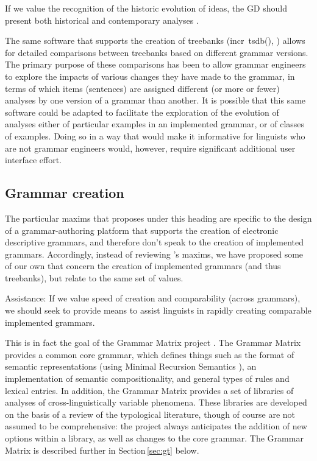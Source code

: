 \documentclass[12pt]{article}
\newcommand{\sref}[1]{Section$\,$\ref{#1}}
\newcommand{\itsdb}{\mbox{\sf \lbrack incr tsdb()\rbrack}}
\begin{document}
\begin{exe}
 If we value the recognition of the historic evolution
of ideas, the GD should present both historical and contemporary
analyses \cite[360]{Noonan:06}.
\end{exe}

The same software that supports the creation of treebanks
({\itsdb}, ) allows for detailed comparisons
between treebanks based on different grammar versions.  The primary
purpose of these comparisons has been to allow grammar engineers
to explore the impacts of various changes they have made to the
grammar, in terms of which items (sentences) are assigned different
(or more or fewer) analyses by one version of a grammar than 
another.  It is possible that this same software could be adapted
to facilitate the exploration of the evolution of analyses either of particular examples
in an implemented grammar, or of classes of examples.  Doing so in a way
that would make it informative for linguists who are not grammar
engineers would, however, require significant additional user interface
effort. 


\subsection{Grammar creation}

The particular maxims that \citeauthor{Nordhoff:08} proposes under
this heading are specific to the design of a grammar-authoring platform
that supports the creation of electronic descriptive grammars, and
therefore don't speak to the creation of implemented grammars. Accordingly,
instead of reviewing \citeauthor{Nordhoff:08}'s maxims, we have
proposed some of our own that concern the creation of implemented
grammars (and thus treebanks), but relate to the same set of values.

\begin{exe}
\ex\label{ex:cc} {\sc Assistance}: If we value speed of creation
and comparability (across grammars), we should seek to provide
means to assist linguists in rapidly creating comparable implemented grammars.
\end{exe}

This is in fact the goal of the Grammar Matrix project
\cite{Ben:Fli:Oep:02,Ben:Dre:Fok:Pou:Sal:10}.  
The Grammar Matrix provides a common core grammar, which defines
things such as the format of semantic representations (using Minimal
Recursion Semantics \cite{Cop:Fli:Pol:Sag:05}), an implementation of
semantic compositionality, and general types of rules and lexical
entries.  In addition, the Grammar Matrix provides a set of libraries
of analyses of cross-linguistically variable phenomena.  These libraries
are developed on the basis of a review of the typological literature,
though of course are not assumed to be comprehensive: the project
always anticipates the addition of new options within a library, as well 
as changes to the core grammar.
The Grammar Matrix is described further in \sref{sec:gt} below.
\end{document}
